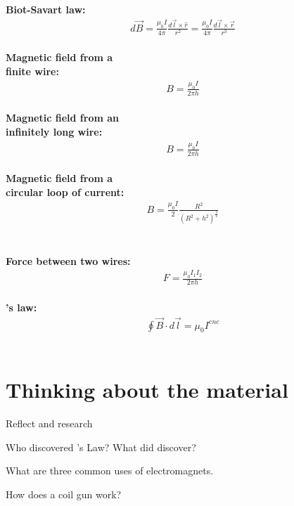 \newpage
\begin{importantEquations}
\begin{multicols}{2}
\textbf{Biot-Savart law:}
\begin{align*}
d\vec B = \frac{\mu_0 I}{4\pi}\frac{d\vec l\times \hat r}{r^2}=\frac{\mu_0 I}{4\pi}\frac{d\vec l\times \vec r}{r^3}
\end{align*}
\\
\textbf{Magnetic field from a\\ finite wire:}
\begin{align*}
B = \frac{\mu_0 I}{2\pi h}
\end{align*}
\\
\textbf{Magnetic field from an\\ infinitely long wire:}
\begin{align*}
B = \frac{\mu_0 I}{2\pi h}
\end{align*}
\\
\textbf{Magnetic field from a \\ circular loop of current:}
\begin{align*}
B=\frac{\mu_0 I}{2} \frac{R^2}{(R^2+h^2)^\frac{3}{2}}
\end{align*}
\\
\columnbreak
\\
\textbf{Force between two wires:}
\begin{align*}
F = \frac{\mu_0I_1I_2}{2\pi h}
\end{align*}
\\
\textbf{\ampere's law:}
\begin{align*}
\oint \vec B \cdot d\vec l =\mu_0 I^{enc}
\end{align*}
\\
\end{multicols}
\end{importantEquations}

\newpage
\section{Thinking about the material}

\begin{chapteractivity}{Reflect and research}
{
\item Who discovered \ampere's Law? What did \amperesp discover?
\item What are three common uses of electromagnets.
\item How does a coil gun work?
}
\end{chapteractivity}


